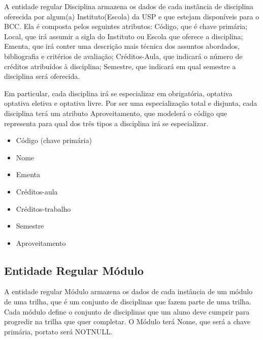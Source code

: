 \documentclass[a4paper]{article}
\begin{document}

A entidade regular Disciplina armazena os dados de cada instância de disciplina
oferecida por algum(a) Instituto(Escola) da USP e que estejam disponíveis para
o BCC. Ela é composta pelos seguintes atributos: Código, que é chave primária;
Local, que irá assumir a sigla do Instituto ou Escola que oferece a disciplina;
Ementa, que irá conter uma descrição mais técnica dos assuntos abordados,
bibliografia e critérios de avaliação; Créditos-Aula, que indicará o número de créditos atribuídos à disciplina; Semestre, que indicará em qual semestre a disciplina será oferecida.

Em particular, cada disciplina irá se especializar em obrigatória, optativa
optativa eletiva e optativa livre. Por ser uma especialização
total e disjunta, cada disciplina terá um atributo Aproveitamento, que modelerá
o código que representa para qual dos três tipos a disciplina irá se
especializar.

\begin{itemize}
    \item Código (chave primária)
    \item Nome
    \item Ementa
    \item Créditos-aula
    \item Créditos-trabalho
    \item Semestre
    \item Aproveitamento
\end{itemize}

\subsection*{Entidade Regular Módulo}

A entidade regular Módulo armazena os dados de cada instância de um módulo de
uma trilha, que é um conjunto de disciplinas que fazem parte de uma trilha. Cada
módulo define o conjunto de disciplinas que um aluno deve cumprir para progredir
na trilha que quer completar. O Módulo terá Nome, que será a chave primária,
portato será NOTNULL.
\end{document}
